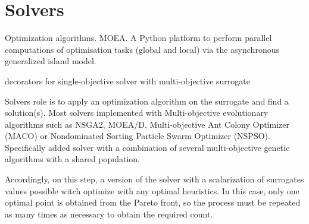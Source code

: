 

\section{Solvers}

    Optimization algorithms. MOEA. A Python platform\cite{francesco_biscani_2019}  to perform parallel computations of optimisation tasks (global and local) via the asynchronous generalized island model.

    decorators for single-objective solver with multi-objective surrogate 

    Solvers role is to apply an optimization algorithm on the surrogate and find a solution(s). Most solvers implemented with Multi-objective evolutionary algorithms such as NSGA2, MOEA/D, Multi-objective Ant Colony Optimizer (MACO) or Nondominated Sorting Particle Swarm Optimizer (NSPSO)\cite{francesco_biscani_2019}. 
    Specifically added solver with a combination of several multi-objective genetic algorithms with a shared population.

    Accordingly, on this step, a version of the solver with a scalarization of surrogates values possible witch optimize with any optimal heuristics. In this case, only one optimal point is obtained from the Pareto front, so the process must be repeated as many times as necessary to obtain the required count. 














